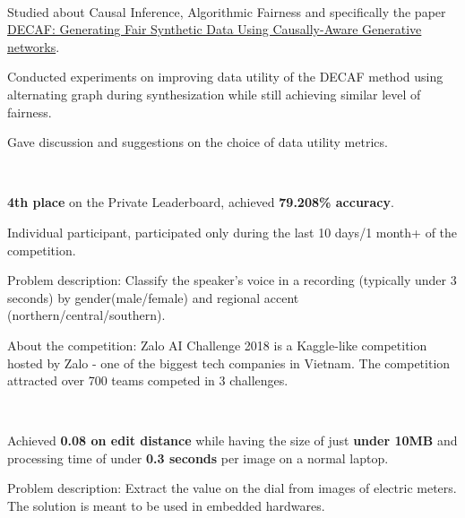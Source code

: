 \\
\begin{xitemize}
    \item Studied about Causal Inference, Algorithmic Fairness and specifically the paper \href{https://arxiv.org/abs/2110.12884}{DECAF: Generating Fair Synthetic Data Using Causally-Aware Generative networks}.
    \item Conducted experiments on improving data utility of the DECAF method using alternating graph during synthesization while still achieving similar level of  fairness.
    \item Gave discussion and suggestions on the choice of data utility metrics.
\end{xitemize}

\\
\begin{xitemize}
    \item \textbf{4th place} on the Private Leaderboard, achieved \textbf{79.208\% accuracy}.
    \item Individual participant, participated only during the last 10 days/1 month+ of
    the competition.
    \item Problem description: Classify the speaker's voice in a recording (typically
    under 3 seconds) by gender(male/female) and regional accent (northern/central/southern).
    \item About the competition: Zalo AI Challenge 2018 is a Kaggle-like competition hosted
    by Zalo - one of the biggest tech companies in Vietnam. The competition attracted
    over 700 teams competed in 3 challenges.
\end{xitemize}

\\
\begin{xitemize}
    \item Achieved \textbf{0.08 on edit distance} while having the size of just
    \textbf{under 10MB} and processing time of under \textbf{0.3 seconds} per image on a
    normal laptop.
    \item Problem description: Extract the value on the dial from images of electric
    meters. The solution is meant to be used in embedded hardwares.
\end{xitemize}



